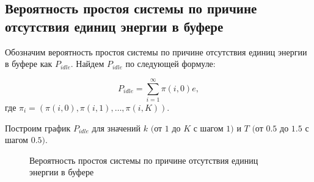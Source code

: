 \documentclass[12pt, a4paper]{article}
\begin{document}
\begin{figure}[h]
\end{figure}

\pagebreak
\begin{flushleft}\subsection{Вероятность простоя системы по причине отсутствия единиц энергии в буфере}\end{flushleft}

Обозначим вероятность простоя системы по причине отсутствия единиц энергии в буфере как $P_{idle}$. Найдем $P_{idle}$ по следующей формуле:

$$P_{idle} = \sum\limits_{i = 1}^{\infty} \pi(i, 0)e,$$ где $\pi_i = (\pi(i, 0), \pi(i, 1), \ldots, \pi(i, K)).$

Построим график $P_{idle}$ для значений $k$ $($от $1$ до $K$ с шагом $1)$ и  $T$ $($от $0.5$ до $1.5$  с шагом $0.5)$.
\begin{figure}[h]
	\caption{Вероятность простоя системы по причине отсутствия единиц энергии в буфере}
	\label{ris6}
\end{figure}
\end{document}
